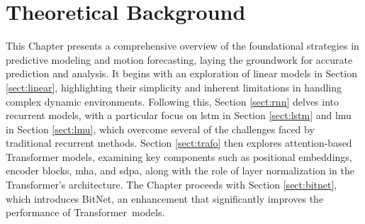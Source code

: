 \chapter{Theoretical Background}
\label{chapt:theoretical_background}

This Chapter presents a comprehensive overview of the foundational strategies in predictive modeling and motion forecasting, laying the groundwork for accurate prediction and analysis. It begins with an exploration of linear models in Section \ref{sect:linear}, highlighting their simplicity and inherent limitations in handling complex dynamic environments. Following this, Section \ref{sect:rnn} delves into recurrent models, with a particular focus on \gls{lstm} in Section \ref{sect:lstm} and \gls{lmu} in Section \ref{sect:lmu}, which overcome several of the challenges faced by traditional recurrent methods. Section \ref{sect:trafo} then explores attention-based Transformer models, examining key components such as positional embeddings, encoder blocks, \gls{mha}, and \gls{sdpa}, along with the role of layer normalization in the Transformer's architecture. The Chapter proceeds with Section \ref{sect:bitnet}, which introduces BitNet, an enhancement that significantly improves the performance of Transformer~models.

